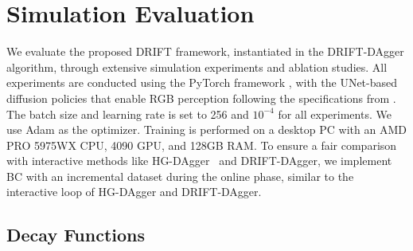


\section{Simulation Evaluation}
\label{sec:simulation_evaluation}

We evaluate the proposed DRIFT framework, instantiated in the DRIFT-DAgger algorithm, through extensive simulation experiments and ablation studies. All experiments are conducted using the PyTorch framework \cite{pytorch}, with the UNet-based diffusion policies that enable RGB perception following the specifications from \citet{chi_dp}. The batch size and learning rate is set to 256 and $10^{-4}$ for all experiments. We use Adam \cite{kingma2014adam} as the optimizer. Training is performed on a desktop PC with an AMD PRO 5975WX CPU, 4090 GPU, and 128GB RAM. To ensure a fair comparison with interactive methods like HG-DAgger~\cite{kelly_hg_dagger} and DRIFT-DAgger, we implement BC with an incremental dataset during the online phase, similar to the interactive loop of HG-DAgger and DRIFT-DAgger.


\subsection{Decay Functions}
\label{sec:abl_rs}

